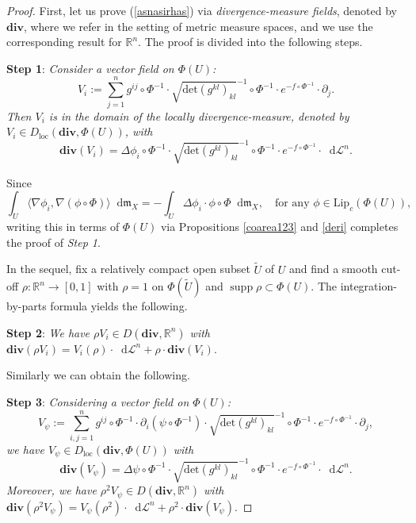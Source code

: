\documentclass[11pt,reqno]{amsart}
\theoremstyle{definition}
\numberwithin{equation}{section}
\newcommand{\di}{\mathop{}\!\mathrm{d}}
\newcommand{\meas}{\mathfrak{m}}
\DeclareMathOperator{\loc}{loc}
\DeclareMathOperator{\supp}{supp}
\begin{document}
\begin{proof}
First, let us prove (\ref{asnasirhas}) via \textit{divergence-measure fields}, denoted by $\mathbf{div}$, where we refer \cite{BCM} in the setting of metric measure spaces, and we use the corresponding result for $\mathbb{R}^n$. The proof is divided into the following steps.
\smallskip


\textbf{Step 1}:  \textit{Consider a vector field on $\Phi(U)$:
$$
   V_i:= \sum_{j=1}^ng^{ij}\circ \Phi^{-1} \cdot \sqrt{\mathrm{det}(g^{kl})_{kl}}^{-1}\circ \Phi^{-1} \cdot e^{-f\circ \Phi^{-1}}\cdot\partial_j. 
$$ 
Then $V_i$ is in the domain of the locally divergence-measure, denoted by $V_i \in D_{\loc}(\mathbf{div}, \Phi(U))$, with
$$
    \mathbf{div}(V_i)=\Delta \phi_i \circ \Phi^{-1}\cdot \sqrt{\mathrm{det}(g^{kl})_{kl}}^{-1}\circ \Phi^{-1}\cdot e^{-f\circ \Phi^{-1}} \cdot \di \mathcal{L}^n.
  $$
}
\smallskip

Since
\begin{equation}
    \int_U\langle \nabla \phi_i, \nabla (\phi \circ \Phi)\rangle \di \meas_X=-\int_U\Delta \phi_i \cdot \phi \circ \Phi \di \meas_X, \quad \text{for any $\phi \in \mathrm{Lip}_c(\Phi(U))$,}
\end{equation}
writing this  in terms of $\Phi(U)$ via Propositions \ref{coarea123} and \ref{deri} completes the proof of \textit{Step 1}.
\smallskip

In the sequel, fix a relatively compact open subset $\tilde U$ of $U$ and find a smooth cut-off $\rho:\mathbb{R}^n \to [0,1]$ with $\rho=1$ on $\Phi(\tilde U)$ and $\supp \rho \subset \Phi(U)$. The integration-by-parts formula yields the following.

\smallskip

\textbf{Step 2}: \textit{We have $\rho V_i \in D(\mathbf{div}, \mathbb{R}^n)$ with $
    \mathbf{div}(\rho V_i)=V_i(\rho)\cdot\di \mathcal{L}^n+\rho \cdot\mathbf{div}(V_i).
$}

\smallskip

Similarly we can obtain the following.

\smallskip

\textbf{Step 3}: \textit{Considering a vector field on $\Phi(U)$: 
$$
    V_{\psi}:=\sum_{i,j=1}^ng^{ij}\circ \Phi^{-1}\cdot \partial_i(\psi\circ \Phi^{-1})\cdot \sqrt{\mathrm{det}(g^{kl})_{kl}}^{-1}\circ \Phi^{-1}\cdot e^{-f\circ \Phi^{-1}}\cdot \partial_j,
$$
we have $V_{\psi} \in D_{\loc}(\mathbf{div}, \Phi(U))$ with 
$$
    \mathbf{div}(V_{\psi})=\Delta \psi \circ \Phi^{-1}\cdot  \sqrt{\mathrm{det}(g^{kl})_{kl}}^{-1}\circ \Phi^{-1}\cdot    e^{-f\circ \Phi^{-1}} \cdot\di \mathcal{L}^n.
$$
Moreover, we have $\rho^2 V_{\psi} \in D(\mathbf{div}, \mathbb{R}^n)$ with
$
    \mathbf{div}(\rho^2V_{\psi})=V_{\psi}(\rho^2)\cdot\di \mathcal{L}^n+\rho^2\cdot\mathbf{div}(V_{\psi}).
$}


\end{proof}
\end{document}
